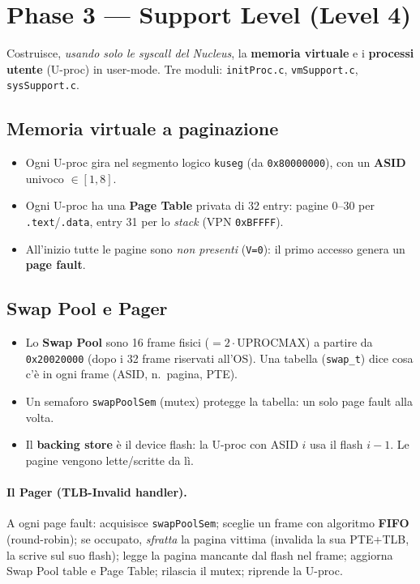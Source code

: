 \documentclass[11pt,a4paper]{article}
\newcommand{\code}[1]{\texttt{#1}}
\begin{document}
\section{Phase 3 --- Support Level (Level 4)}

Costruisce, \emph{usando solo le syscall del Nucleus}, la \textbf{memoria
virtuale} e i \textbf{processi utente} (U-proc) in user-mode. Tre moduli:
\code{initProc.c}, \code{vmSupport.c}, \code{sysSupport.c}.

\subsection{Memoria virtuale a paginazione}
\begin{itemize}
\item Ogni U-proc gira nel segmento logico \code{kuseg} (da
  \code{0x80000000}), con un \textbf{ASID} univoco $\in[1,8]$.
\item Ogni U-proc ha una \textbf{Page Table} privata di 32 entry: pagine 0--30
  per \code{.text}/\code{.data}, entry 31 per lo \emph{stack} (VPN
  \code{0xBFFFF}).
\item All'inizio tutte le pagine sono \emph{non presenti} (\code{V=0}): il primo
  accesso genera un \textbf{page fault}.
\end{itemize}

\subsection{Swap Pool e Pager}
\begin{itemize}
\item Lo \textbf{Swap Pool} sono 16 frame fisici ($=2\cdot$UPROCMAX) a partire
  da \code{0x20020000} (dopo i 32 frame riservati all'OS). Una tabella
  (\code{swap\_t}) dice cosa c'è in ogni frame (ASID, n.\ pagina, PTE).
\item Un semaforo \code{swapPoolSem} (mutex) protegge la tabella: un solo page
  fault alla volta.
\item Il \textbf{backing store} è il device flash: la U-proc con ASID $i$ usa il
  flash $i-1$. Le pagine vengono lette/scritte da lì.
\end{itemize}

\paragraph{Il Pager (TLB-Invalid handler).} A ogni page fault: acquisisce
\code{swapPoolSem}; sceglie un frame con algoritmo \textbf{FIFO} (round-robin);
se occupato, \emph{sfratta} la pagina vittima (invalida la sua PTE+TLB, la
scrive sul suo flash); legge la pagina mancante dal flash nel frame; aggiorna
Swap Pool table e Page Table; rilascia il mutex; riprende la U-proc.
\end{document}
